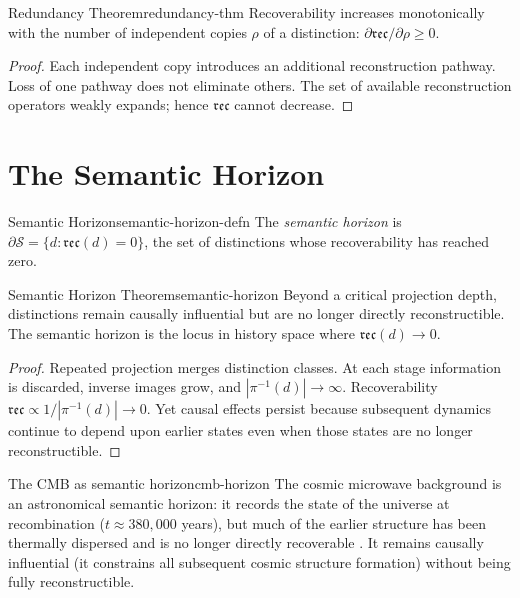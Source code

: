 \documentclass[12pt,twoside,openright]{book}
\newcommand{\physicon}{\marginpar{\tiny\color{DistGray}\faAtom}}
\newcommand{\reco}{\mathfrak{rec}}
\begin{document}
\begin{theorem}{Redundancy Theorem}{redundancy-thm}
  Recoverability increases monotonically with the number
  of independent copies $\rho$ of a distinction:
  $\partial\reco/\partial\rho \ge 0$.
\end{theorem}

\begin{proof}
  Each independent copy introduces an additional
  reconstruction pathway. Loss of one pathway does not
  eliminate others. The set of available reconstruction
  operators weakly expands; hence $\reco$ cannot decrease.
\end{proof}

\section{The Semantic Horizon}
\label{sec:ch5-horizon}

\begin{definition}{Semantic Horizon}{semantic-horizon-defn}
  The \emph{semantic horizon} is
  $\partial\mathcal{S} = \{d : \reco(d) = 0\}$,
  the set of distinctions whose recoverability has
  reached zero.
\end{definition}

\begin{theorem}{Semantic Horizon Theorem}{semantic-horizon}
  Beyond a critical projection depth, distinctions remain
  causally influential but are no longer directly
  reconstructible. The semantic horizon is the locus in
  history space where $\reco(d) \to 0$.
\end{theorem}

\begin{proof}
  Repeated projection merges distinction classes.
  At each stage information is discarded, inverse images
  grow, and $|\pi^{-1}(d)| \to \infty$.
  Recoverability $\reco \propto 1/|\pi^{-1}(d)| \to 0$.
  Yet causal effects persist because subsequent dynamics
  continue to depend upon earlier states even when those
  states are no longer reconstructible.
\end{proof}

\begin{remark}{The CMB as semantic horizon}{cmb-horizon}
  \physicon
  The cosmic microwave background is an astronomical
  semantic horizon: it records the state of the universe
  at recombination ($t \approx 380{,}000$ years), but
  much of the earlier structure has been thermally
  dispersed and is no longer directly recoverable
  \parencite{penrose2010}. It remains causally influential
  (it constrains all subsequent cosmic structure
  formation) without being fully reconstructible.
\end{remark}
\end{document}
